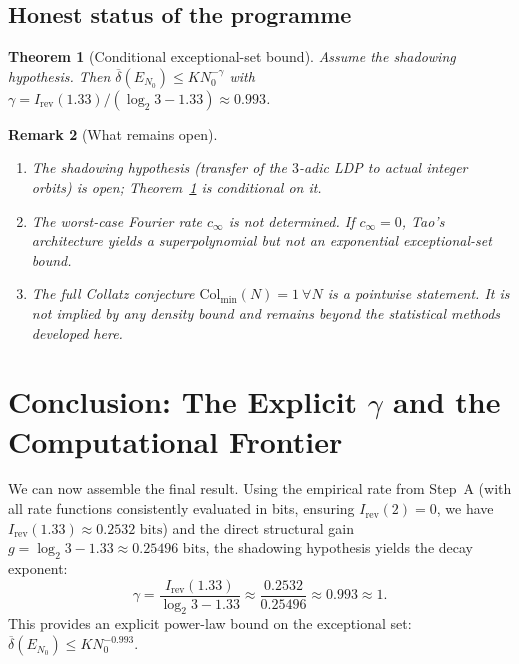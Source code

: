\documentclass[12pt,a4paper]{article}
\newtheorem{theorem}{Theorem}[section]
\newtheorem{remark}[theorem]{Remark}
\begin{document}
\subsection{Honest status of the programme}

\begin{theorem}[Conditional exceptional-set bound]
\label{thm:final}
Assume the shadowing hypothesis. Then
$\overline\delta(E_{N_0})\le K N_0^{-\gamma}$ with
$\gamma=I_{\mathrm{rev}}(1.33)/(\log_2 3-1.33)\approx0.993$.
\end{theorem}

\begin{remark}[What remains open]
\begin{enumerate}
\item[(i)] The shadowing hypothesis (transfer of the $3$-adic LDP to actual
integer orbits) is open; Theorem~\ref{thm:final} is conditional on it.
\item[(ii)] The worst-case Fourier rate $c_\infty$ is not determined. If
$c_\infty=0$, Tao's architecture yields a superpolynomial but not an
exponential exceptional-set bound.
\item[(iii)] The full Collatz conjecture $\mathrm{Col}_{\min}(N)=1\ \forall N$
is a pointwise statement. It is not implied by any density bound and remains
beyond the statistical methods developed here.
\end{enumerate}
\end{remark}

\section{Conclusion: The Explicit $\gamma$ and the Computational Frontier}
\label{sec:conclusion}

We can now assemble the final result. Using the empirical rate from Step~A (with all rate functions consistently evaluated in bits, ensuring $I_{\mathrm{rev}}(2)=0$, we have $I_{\mathrm{rev}}(1.33) \approx 0.2532\text{ bits}$) and the direct structural gain $g = \log_2 3 - 1.33 \approx 0.25496\text{ bits}$, the shadowing hypothesis yields the decay exponent:
\[
\gamma = \frac{I_{\mathrm{rev}}(1.33)}{\log_2 3 - 1.33} \approx \frac{0.2532}{0.25496} \approx 0.993 \approx 1.
\]
This provides an explicit power-law bound on the exceptional set: $\overline\delta(E_{N_0}) \le K N_0^{-0.993}$.
\end{document}
